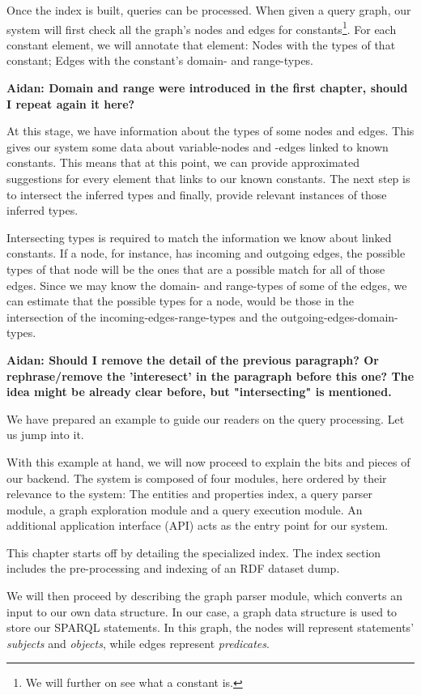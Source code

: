 Once the index is built, queries can be processed. When given a query graph, our system will first check all the graph's nodes and edges for constants\footnote{We will further on see what a constant is.}. For each constant element, we will annotate that element: Nodes with the types of that constant; Edges with the constant's domain- and range-types. 

\textbf{Aidan: Domain and range were introduced in the first chapter, should I repeat again it here?}

At this stage, we have information about the types of some nodes and edges. This gives our system some data about variable-nodes and -edges linked to known constants. This means that at this point, we can provide approximated suggestions for every element that links to our known constants. The next step is to intersect the inferred types and finally, provide relevant instances of those inferred types. 

Intersecting types is required to match the information we know about linked constants. If a node, for instance, has incoming and outgoing edges, the possible types of that node will be the ones that are a possible match for all of those edges. Since we may know the domain- and range-types of some of the edges, we can estimate that the possible types for a node, would be those in the intersection of the incoming-edges-range-types and the outgoing-edges-domain-types.

\textbf{Aidan: Should I remove the detail of the previous paragraph? Or rephrase/remove the 'interesect' in the paragraph before this one? The idea might be already clear before, but "intersecting" is mentioned.}

We have prepared an example to guide our readers on the query processing. Let us jump into it.

With this example at hand, we will now proceed to explain the bits and pieces of our backend. The system is composed of four modules, here ordered by their relevance to the system: 
The entities and properties index,
a query parser module,
a graph exploration module and
a query execution module. 
An additional application interface (API) acts as the entry point for our system.

This chapter starts off by detailing the specialized index.
The index section includes the pre-processing and indexing of an RDF dataset dump.

We will then proceed by describing the graph parser module, which converts an input to our own data structure. 
In our case, a graph data structure is used to store our SPARQL statements. 
In this graph, the nodes will represent statements' \textit{subjects} and \textit{objects}, while edges represent \textit{predicates}. 

